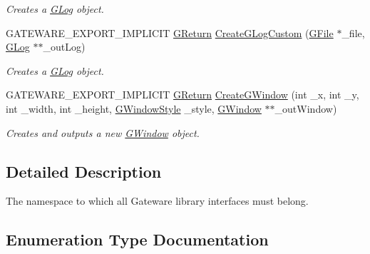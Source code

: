 \begin{DoxyCompactItemize}
\begin{DoxyCompactList}\small\item\em Creates a \mbox{\hyperlink{classGW_1_1SYSTEM_1_1GLog}{G\+Log}} object. \end{DoxyCompactList}\item 
G\+A\+T\+E\+W\+A\+R\+E\+\_\+\+E\+X\+P\+O\+R\+T\+\_\+\+I\+M\+P\+L\+I\+C\+IT \mbox{\hyperlink{namespaceGW_a67a839e3df7ea8a5c5686613a7a3de21}{G\+Return}} \mbox{\hyperlink{namespaceGW_1_1SYSTEM_adc1b7d81acb493280fb43e36ef5fca56}{Create\+G\+Log\+Custom}} (\mbox{\hyperlink{classGW_1_1SYSTEM_1_1GFile}{G\+File}} $\ast$\+\_\+file, \mbox{\hyperlink{classGW_1_1SYSTEM_1_1GLog}{G\+Log}} $\ast$$\ast$\+\_\+out\+Log)
\begin{DoxyCompactList}\small\item\em Creates a \mbox{\hyperlink{classGW_1_1SYSTEM_1_1GLog}{G\+Log}} object. \end{DoxyCompactList}\item 
G\+A\+T\+E\+W\+A\+R\+E\+\_\+\+E\+X\+P\+O\+R\+T\+\_\+\+I\+M\+P\+L\+I\+C\+IT \mbox{\hyperlink{namespaceGW_a67a839e3df7ea8a5c5686613a7a3de21}{G\+Return}} \mbox{\hyperlink{namespaceGW_1_1SYSTEM_a4e046f8c5f7a2eabd19a903c9a0651f7}{Create\+G\+Window}} (int \+\_\+x, int \+\_\+y, int \+\_\+width, int \+\_\+height, \mbox{\hyperlink{namespaceGW_1_1SYSTEM_ad117891e556631f842625c348d36a071}{G\+Window\+Style}} \+\_\+style, \mbox{\hyperlink{classGW_1_1SYSTEM_1_1GWindow}{G\+Window}} $\ast$$\ast$\+\_\+out\+Window)
\begin{DoxyCompactList}\small\item\em Creates and outputs a new \mbox{\hyperlink{classGW_1_1SYSTEM_1_1GWindow}{G\+Window}} object. \end{DoxyCompactList}\end{DoxyCompactItemize}


\subsection{Detailed Description}
The namespace to which all Gateware library interfaces must belong. 

\subsection{Enumeration Type Documentation}
\mbox{\label{namespaceGW_1_1SYSTEM_a309fd3a92512dd2bfa8065d99c0d7fcb}} 
